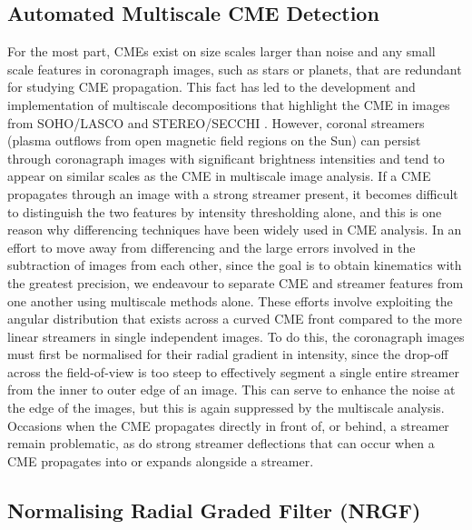 \documentclass[namedreferences]{SolarPhysics}
\begin{document}
\begin{article}
\subsection{Automated Multiscale CME Detection}
\label{automatedmultiscale}

For the most part, CMEs exist on size scales larger than noise and any small scale features in coronagraph images, such as stars or planets, that are redundant for studying CME propagation. This fact has led to the development and implementation of multiscale decompositions that highlight the CME in images from SOHO/LASCO and STEREO/SECCHI \citep{2008SoPh..248..457Y, 2009A&A...495..325B, 2003A&A...398.1185S}. However, coronal streamers (plasma outflows from open magnetic field regions on the Sun) can persist through coronagraph images with significant brightness intensities and tend to appear on similar scales as the CME in multiscale image analysis. If a CME propagates through an image with a strong streamer present, it becomes difficult to distinguish the two features by intensity thresholding alone, and this is one reason why differencing techniques have been widely used in CME analysis. In an effort to move away from differencing and the large errors involved in the subtraction of images from each other, since the goal is to obtain kinematics with the greatest precision, we endeavour to separate CME and streamer features from one another using multiscale methods alone. These efforts involve exploiting the angular distribution that exists across a curved CME front compared to the more linear streamers in single independent images. To do this, the coronagraph images must first be normalised for their radial gradient in intensity, since the drop-off across the field-of-view is too steep to effectively segment a single entire streamer from the inner to outer edge of an image. This can serve to enhance the noise at the edge of the images, but this is again suppressed by the multiscale analysis. Occasions when the CME propagates directly in front of, or behind, a streamer remain problematic, as do strong streamer deflections that can occur when a CME propagates into or expands alongside a streamer.

\subsection{Normalising Radial Graded Filter (NRGF)}


\end{article}
\end{document}
